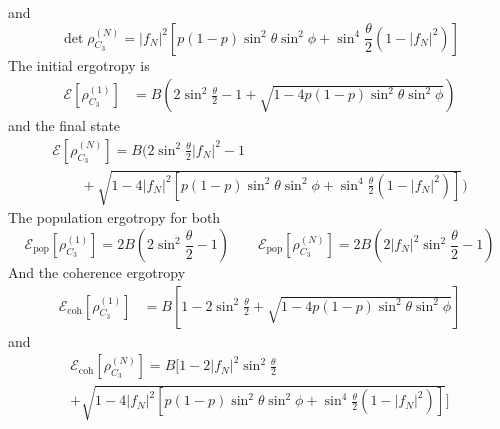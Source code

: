\documentclass[../../../main.tex]{subfiles}
\begin{document}
and
\begin{equation*}
  \det \rho ^{(N)}_{C_3} =     |f_N|^2 \left[  p(1-p)\sin ^2\theta \sin^2 \phi + \sin^4 \frac{\theta}{2} (1-|f_N|^2)\right]
\end{equation*}
The initial ergotropy is
\begin{align*}
  \mathcal{E} \left[ \rho^{(1)}_{C_3} \right]
   & = B \left( 2\sin^2 \frac{\theta }{2} - 1 + \sqrt{1 - 4p(1-p)\sin ^2\theta \sin^2 \phi}  \right)
\end{align*}
and the final state
\begin{multline*}
  \mathcal{E} \left[ \rho^{(N)}_{C_3} \right]     = B \bigg( 2\sin^2 \frac{\theta }{2} |f_N|^2 - 1
  \\  \qquad+  \sqrt{1 - 4|f_N|^2 \left[ p(1-p)\sin ^2\theta \sin^2 \phi + \sin ^4 \frac{\theta }{2 }(1-|f_N|^2) \right]}  \bigg)
\end{multline*}
The population ergotropy for both
\begin{equation*}
  \mathcal{E}_\text{pop} \left[ \rho^{(1)}_{C_3} \right]= 2B(2 \sin^2 \frac{\theta }{2 }-1)  \qquad
  \mathcal{E}_\text{pop} \left[ \rho^{(N)}_{C_3} \right]= 2B(2 |f_N|^2\sin ^2\frac{\theta}{2 }-1)
\end{equation*}
And the coherence ergotropy
\begin{align*}
  \mathcal{E}_\text{coh}\left[ \rho^{(1)}_{C_3}\right]
   & = B \left[  1 - 2 \sin ^2 \frac{\theta }{2} + \sqrt{1-4p(1-p)\sin ^2\theta \sin^2 \phi}  \right]
\end{align*}
and
\begin{multline*}
  \mathcal{E}_\text{coh}\left[ \rho^{(N)}_{C_3}\right]
  = B \bigg[  1 - 2 |f_N|^2\sin ^2 \frac{\theta }{2} \\
    + \sqrt{1-4 |f_N|^2 \left[ p(1-p)\sin ^2\theta \sin^2 \phi
        + \sin ^4 \frac{\theta }{2 }(1-|f_N|^2) \right] }  \bigg]
\end{multline*}
\end{document}
